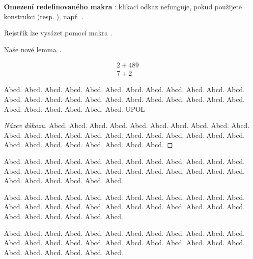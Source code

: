 \documentclass[
  master=false,               %
  font=sans,                  %
  printversion=false,         %
  joinlists=true,             %
  glossaries=true,            %
  figures=true,               %
  tables=true,                %
  sourcecodes=true,					  %
  theorems=true,						  %
  bibencoding=utf8,           %
  language=czech,             %
  encoding=utf8,              %
  field=inf,                  %
  index=true,                 %
  biblatex=true               %
]{updiplom}
\begin{document}
\textbf{Omezení redefinovaného makra }: klikací odkaz nefunguje, pokud použijete konstrukci  (resp. ), např. .
  
Rejstřík lze vysázet pomocí makra .

\begin{lemma}
Naše nové lemma~\cite{kniha2}.
\end{lemma}

\begin{align}
2+489 \\
7+2
\end{align}


\begin{definition}
Abcd. Abcd. Abcd. Abcd. Abcd. Abcd. Abcd. Abcd. Abcd. Abcd. Abcd. Abcd. Abcd. Abcd. Abcd. Abcd. Abcd. Abcd. Abcd. Abcd. Abcd. Abcd. Abcd. Abcd. Abcd. Abcd. Abcd. Abcd. Abcd. Abcd. \gls{UPOL}
\end{definition}

\begin{proof}[Název důkazu]
Abcd. Abcd. Abcd. Abcd. Abcd. Abcd. Abcd. Abcd. Abcd. Abcd. Abcd. Abcd. Abcd. Abcd. Abcd. Abcd. Abcd. Abcd. Abcd. Abcd. Abcd. Abcd. Abcd. Abcd. Abcd. Abcd. Abcd. Abcd. Abcd. Abcd. 
\end{proof}

\begin{remark}
Abcd. Abcd. Abcd. Abcd. Abcd. Abcd. Abcd. Abcd. Abcd. Abcd. Abcd. Abcd. Abcd. Abcd. Abcd. Abcd. Abcd. Abcd. Abcd. Abcd. Abcd. Abcd. Abcd. Abcd. Abcd. Abcd. Abcd. Abcd. Abcd. Abcd. 
\end{remark}

\begin{example}
Abcd. Abcd. Abcd. Abcd. Abcd. Abcd. Abcd. Abcd. Abcd. Abcd. Abcd. Abcd. Abcd. Abcd. Abcd. Abcd. Abcd. Abcd. Abcd. Abcd. Abcd. Abcd. Abcd. Abcd. Abcd. Abcd. Abcd. Abcd. Abcd. Abcd. 
\end{example}

\begin{lemma}
Abcd. Abcd. Abcd. Abcd. Abcd. Abcd. Abcd. Abcd. Abcd. Abcd. Abcd. Abcd. Abcd. Abcd. Abcd. Abcd. Abcd. Abcd. Abcd. Abcd. Abcd. Abcd. Abcd. Abcd. Abcd. Abcd. Abcd. Abcd. Abcd. Abcd. 
\end{lemma}
\end{document}
